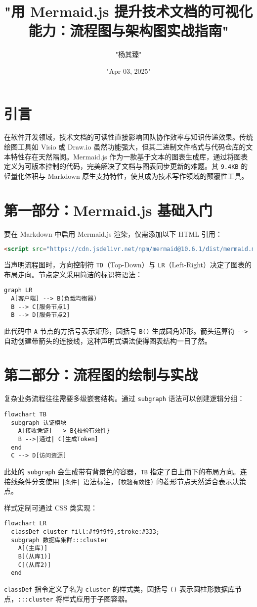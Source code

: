 \title{"用 Mermaid.js 提升技术文档的可视化能力：流程图与架构图实战指南"}
\author{"杨其臻"}
\date{"Apr 03, 2025"}
\maketitle
\chapter{引言}
在软件开发领域，技术文档的可读性直接影响团队协作效率与知识传递效果。传统绘图工具如 Visio 或 Draw.io 虽然功能强大，但其二进制文件格式与代码仓库的文本特性存在天然隔阂。Mermaid.js 作为一款基于文本的图表生成库，通过将图表定义为可版本控制的代码，完美解决了文档与图表同步更新的难题。其 \verb!9.4KB! 的轻量化体积与 Markdown 原生支持特性，使其成为技术写作领域的颠覆性工具。\par
\chapter{第一部分：Mermaid.js 基础入门}
要在 Markdown 中启用 Mermaid.js 渲染，仅需添加以下 HTML 引用：\par
\begin{lstlisting}[language=html]
<script src="https://cdn.jsdelivr.net/npm/mermaid@10.6.1/dist/mermaid.min.js"></script>
\end{lstlisting}
当声明流程图时，方向控制符 \verb!TD!（Top-Down）与 \verb!LR!（Left-Right）决定了图表的布局走向。节点定义采用简洁的标识符语法：\par
\begin{lstlisting}[language=mermaid]
graph LR
  A[客户端] --> B(负载均衡器)
  B --> C[服务节点1]
  B --> D[服务节点2]
\end{lstlisting}
此代码中 \verb!A! 节点的方括号表示矩形，圆括号 \verb!B()! 生成圆角矩形。箭头运算符 \verb!-->! 自动创建带箭头的连接线，这种声明式语法使得图表结构一目了然。\par
\chapter{第二部分：流程图的绘制与实战}
复杂业务流程往往需要多级嵌套结构。通过 \verb!subgraph! 语法可以创建逻辑分组：\par
\begin{lstlisting}[language=mermaid]
flowchart TB
  subgraph 认证模块
    A[接收凭证] --> B{校验有效性}
    B -->|通过| C[生成Token]
  end
  C --> D[访问资源]
\end{lstlisting}
此处的 \verb!subgraph! 会生成带有背景色的容器，\verb!TB! 指定了自上而下的布局方向。连接线条件分支使用 \verb!|条件|! 语法标注，\verb!{校验有效性}! 的菱形节点天然适合表示决策点。\par
样式定制可通过 CSS 类实现：\par
\begin{lstlisting}[language=mermaid]
flowchart LR
  classDef cluster fill:#f9f9f9,stroke:#333;
  subgraph 数据库集群:::cluster
    A[(主库)]
    B[(从库1)]
    C[(从库2)]
  end
\end{lstlisting}
\verb!classDef! 指令定义了名为 \verb!cluster! 的样式类，圆括号 \verb!()! 表示圆柱形数据库节点，\verb!:::cluster! 将样式应用于子图容器。\par
